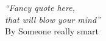 
\cleardoublepage

\vspace*{8cm}

\begin{flushright}
   \textsl{``Fancy quote here, \\
           that will blow your mind''} \\
\vspace*{1.5cm}
           By Someone really smart
\end{flushright}
